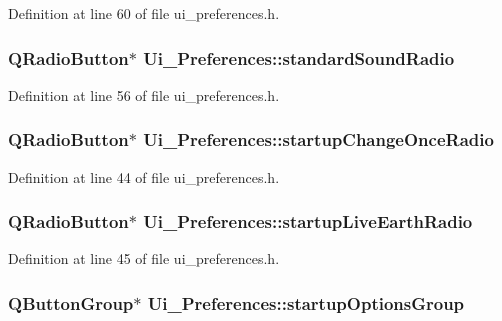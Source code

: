 Definition at line 60 of file ui\_\-preferences.h.

\hypertarget{classUi__Preferences_abe820ad572ad1d1bc9464e9fc1e91a81}{
\subsubsection[{standardSoundRadio}]{\setlength{\rightskip}{0pt plus 5cm}QRadioButton$\ast$ {\bf Ui\_\-Preferences::standardSoundRadio}}}
\label{classUi__Preferences_abe820ad572ad1d1bc9464e9fc1e91a81}


Definition at line 56 of file ui\_\-preferences.h.

\hypertarget{classUi__Preferences_a394530273401e5624c80f0b0665a8242}{
\subsubsection[{startupChangeOnceRadio}]{\setlength{\rightskip}{0pt plus 5cm}QRadioButton$\ast$ {\bf Ui\_\-Preferences::startupChangeOnceRadio}}}
\label{classUi__Preferences_a394530273401e5624c80f0b0665a8242}


Definition at line 44 of file ui\_\-preferences.h.

\hypertarget{classUi__Preferences_ad4180835bda75254d45f8f6a8bde10a6}{
\subsubsection[{startupLiveEarthRadio}]{\setlength{\rightskip}{0pt plus 5cm}QRadioButton$\ast$ {\bf Ui\_\-Preferences::startupLiveEarthRadio}}}
\label{classUi__Preferences_ad4180835bda75254d45f8f6a8bde10a6}


Definition at line 45 of file ui\_\-preferences.h.

\hypertarget{classUi__Preferences_a675b828e13ef715d551de75d9f1d9aa7}{
\subsubsection[{startupOptionsGroup}]{\setlength{\rightskip}{0pt plus 5cm}QButtonGroup$\ast$ {\bf Ui\_\-Preferences::startupOptionsGroup}}}
\label{classUi__Preferences_a675b828e13ef715d551de75d9f1d9aa7}


